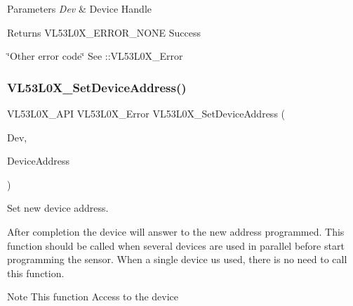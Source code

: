 \begin{DoxyParams}{Parameters}
{\em Dev} & Device Handle \\
\hline
\end{DoxyParams}
\begin{DoxyReturn}{Returns}
V\+L53\+L0\+X\+\_\+\+E\+R\+R\+O\+R\+\_\+\+N\+O\+NE Success 

\char`\"{}\+Other error code\char`\"{} See \+::\+V\+L53\+L0\+X\+\_\+\+Error 
\end{DoxyReturn}
\mbox{\label{group__VL53L0X__init__group_ga7cb9d3ec8f6e74e921df2eeb600647d7}} 
\subsubsection{\texorpdfstring{V\+L53\+L0\+X\+\_\+\+Set\+Device\+Address()}{VL53L0X\_SetDeviceAddress()}}
{\footnotesize\ttfamily V\+L53\+L0\+X\+\_\+\+A\+PI V\+L53\+L0\+X\+\_\+\+Error V\+L53\+L0\+X\+\_\+\+Set\+Device\+Address (\begin{DoxyParamCaption}\item[{\hyperlink{group__VL53L0X__platform__group_ga2d6405308b1dd524b462f1b8fb97d167}{V\+L53\+L0\+X\+\_\+\+D\+EV}}]{Dev,  }\item[{\hyperlink{vl53l0x__types_8h_aba7bc1797add20fe3efdf37ced1182c5}{uint8\+\_\+t}}]{Device\+Address }\end{DoxyParamCaption})}



Set new device address. 

After completion the device will answer to the new address programmed. This function should be called when several devices are used in parallel before start programming the sensor. When a single device us used, there is no need to call this function.

\begin{DoxyNote}{Note}
This function Access to the device
\end{DoxyNote}

